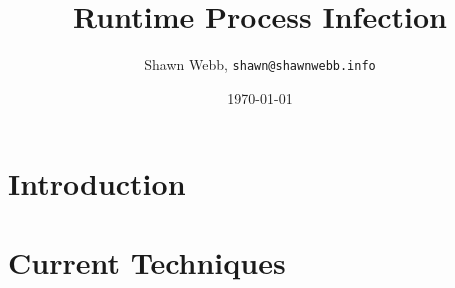 \documentclass[twocolumn]{article}
\begin{document}
\title{Runtime Process Infection}
\author{Shawn Webb, \texttt{shawn@shawnwebb.info}}
\date{\today}
\maketitle

\begin{abstract}

\end{abstract}

\section{Introduction}


\section{Current Techniques}

\end{document}
